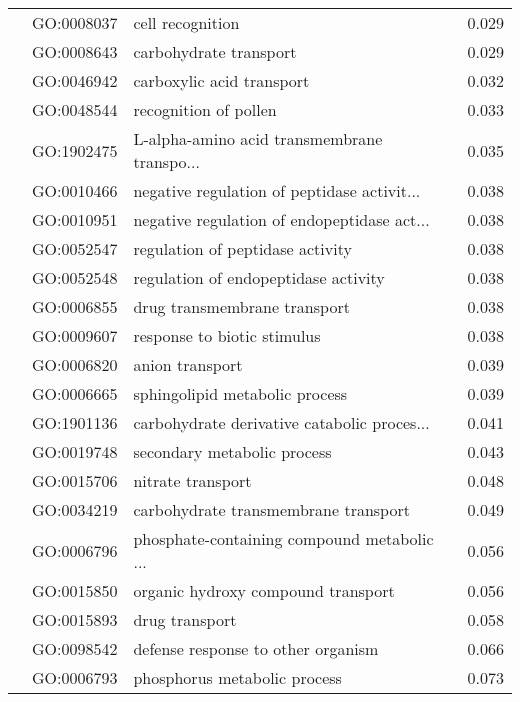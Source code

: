 \begin{longtable}{lllr}
   & GO:0008037 &                             cell recognition &         0.029 \\
   & GO:0008643 &                       carbohydrate transport &         0.029 \\
   & GO:0046942 &                    carboxylic acid transport &         0.032 \\
   & GO:0048544 &                        recognition of pollen &         0.033 \\
   & GO:1902475 &  L-alpha-amino acid transmembrane transpo... &         0.035 \\
   & GO:0010466 &  negative regulation of peptidase activit... &         0.038 \\
   & GO:0010951 &  negative regulation of endopeptidase act... &         0.038 \\
   & GO:0052547 &             regulation of peptidase activity &         0.038 \\
   & GO:0052548 &         regulation of endopeptidase activity &         0.038 \\
   & GO:0006855 &                 drug transmembrane transport &         0.038 \\
   & GO:0009607 &                  response to biotic stimulus &         0.038 \\
   & GO:0006820 &                              anion transport &         0.039 \\
   & GO:0006665 &               sphingolipid metabolic process &         0.039 \\
   & GO:1901136 &  carbohydrate derivative catabolic proces... &         0.041 \\
   & GO:0019748 &                  secondary metabolic process &         0.043 \\
   & GO:0015706 &                            nitrate transport &         0.048 \\
   & GO:0034219 &         carbohydrate transmembrane transport &         0.049 \\
   & GO:0006796 &  phosphate-containing compound metabolic ... &         0.056 \\
   & GO:0015850 &           organic hydroxy compound transport &         0.056 \\
   & GO:0015893 &                               drug transport &         0.058 \\
   & GO:0098542 &           defense response to other organism &         0.066 \\
   & GO:0006793 &                 phosphorus metabolic process &         0.073 \\

\end{longtable}

